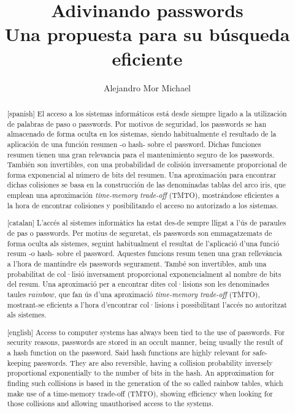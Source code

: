 \documentclass[12pt,spanish,listoffigures,listoftables,listofalgorithms]{tfgetsinf}
\title{Adivinando passwords \\
         Una propuesta para su búsqueda eficiente}
\author{Alejandro Mor Michael}
\begin{document}
\begin{abstract}[spanish]
El acceso a los sistemas informáticos está desde siempre ligado a la utilización de palabras de paso o passwords. Por motivos de seguridad, los passwords se han almacenado de forma oculta en los sistemas, siendo habitualmente el resultado de la aplicación de una función resumen -o hash- sobre el password. Dichas funciones resumen tienen una gran relevancia para el mantenimiento seguro de los passwords. También son invertibles, con una probabilidad de colisión inversamente proporcional de forma exponencial al número de bits del resumen. Una aproximación para encontrar dichas colisiones se basa en la construcción de las denominadas tablas del arco iris, que emplean una aproximación \textit{time-memory trade-off} (TMTO), mostrándose eficientes a la hora de encontrar colisiones y posibilitando el acceso no autorizado a los sistemas.
\end{abstract}

\begin{abstract}[catalan]
L'accés al sistemes informàtics ha estat des-de sempre lligat a l'ús de paraules de pas o passwords. Per motius de seguretat, els passwords son emmagatzemats de forma oculta als sistemes, seguint habitualment el resultat de l'aplicació d'una funció resum -o hash- sobre el password. Aquestes funcions resum tenen una gran rellevància a l'hora de mantindre els passwords segurament. També son invertibles, amb una probabilitat de col·lisió inversament proporcional exponencialment al nombre de bits del resum. Una aproximació per a encontrar dites col·lisions son les denominades taules $rainbow$, que fan ús d'una aproximació \textit{time-memory trade-off} (TMTO), mostrant-se eficients a l'hora d'encontrar col·lisions i possibilitant l'accés no autoritzat als sistemes.
\end{abstract}

\begin{abstract}[english]
Access to computer systems has always been tied to the use of passwords. For security reasons, passwords are stored in an occult manner, being usually the result of a hash function on the password. Said hash functions are highly relevant for safe-keeping passwords. They are also reversible, having a collision probability inversely proportional exponentially to the number of bits in the hash. An approximation for finding such collisions is based in the generation of the so called rainbow tables, which make use of a time-memory trade-off (TMTO), showing efficiency when looking for those collisions and allowing unauthorised access to the systems.
\end{abstract}
\end{document}
